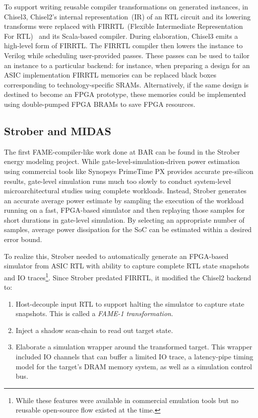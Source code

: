 To support writing reusable compiler transformations on generated instances, in
Chisel3, Chisel2's internal representation~(IR) of an RTL circuit and its
lowering transforms were replaced with FIRRTL~(Flexible Intermediate
Representation For RTL)~\cite{FIRRTL} and its Scala-based compiler. During
elaboration, Chisel3 emits a high-level form of FIRRTL. The FIRRTL compiler
then lowers the instance to Verilog while scheduling user-provided passes. These passes can be used to
tailor an instance to a particular backend: for instance, when preparing a
design for an ASIC implementation FIRRTL memories can be replaced
black boxes corresponding to technology-specific SRAMs. Alternatively, if the same
design is destined to become an FPGA prototype, these memories could be implemented using double-pumped
FPGA BRAMs to save FPGA resources.

\subsection{Strober and MIDAS}\label{sec:midas-intro}

The first FAME-compiler-like work done at BAR can be found in the
Strober~\cite{Strober} energy modeling project. While
gate-level-simulation-driven power estimation using commercial tools like
Synopsys PrimeTime PX provides accurate pre-silicon results, gate-level
simulation runs much too slowly to conduct system-level microarchitectural studies using
complete workloads. Instead, Strober generates an accurate average power
estimate by sampling the execution of the workload running on a fast,
FPGA-based simulator and then replaying those samples for short durations in
gate-level simulation. By selecting an appropriate number of samples, average
power dissipation for the SoC can be estimated within a desired error bound.

To realize this, Strober needed to automatically generate an FPGA-based
simulator from ASIC RTL with ability to capture complete RTL state snapshots
and IO traces\footnote{While these features were available in commercial
emulation tools but no reusable open-source flow existed at the time.}.
Since Strober predated FIRRTL, it modified the Chisel2 backend to:
\begin{enumerate}
    \item Host-decouple input RTL to support halting the simulator to capture
        state snapshots. This is called a \emph{FAME-1 transformation}.
    \item Inject a shadow scan-chain to read out target state.
    \item Elaborate a simulation wrapper around the transformed target. This
        wrapper included IO channels that can buffer a limited IO trace, a
        latency-pipe timing model for the target's DRAM memory system, as well
        as a simulation control bus.
\end{enumerate}

